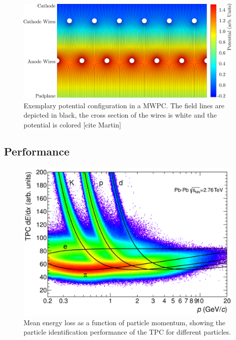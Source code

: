 \begin{center}
\begin{figure}[h!]
\centering
\includegraphics[width=0.8\columnwidth]{pictures/MWPC_fieldlines.pdf}
\caption{Exemplary potential configuration in a MWPC. The field lines are depicted in black, the cross section of the wires is white and the potential is colored [cite Martin]}
\label{fig: MWPC_fieldlines}
\end{figure}
\end{center} 

\subsection{Performance}

\begin{center}
\begin{figure}
\centering
\includegraphics[width=0.8\columnwidth]{pictures/TPC_performance.png}
\caption{Mean energy loss as a function of particle momentum, showing the particle identification performance of the TPC for different particles.}
\label{fig: MWPC_fieldlines}
\end{figure}
\end{center}

